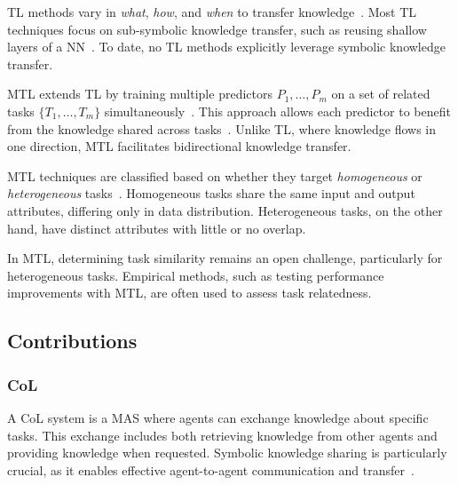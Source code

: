 \Gls{TL} methods vary in \emph{what}, \emph{how}, and \emph{when} to transfer knowledge~\cite{survey-transfer-learning-sinno-2010}.
%
Most \gls{TL} techniques focus on sub-symbolic knowledge transfer, such as reusing shallow layers of a \gls{NN}~\cite{cnn-tl-imagenet-shin-2016}.
%
To date, no \gls{TL} methods explicitly leverage symbolic knowledge transfer.

\gls{MTL} extends \gls{TL} by training multiple predictors \(P_1, \dots, P_m\) on a set of related tasks \(\{T_1, \dots, T_m\}\) simultaneously~\cite{multi-task-learning-caruana-1997}.
%
This approach allows each predictor to benefit from the knowledge shared across tasks~\cite{survey-multi-task-learning-zhang-2021}.
%
Unlike \gls{TL}, where knowledge flows in one direction, \gls{MTL} facilitates bidirectional knowledge transfer.

\gls{MTL} techniques are classified based on whether they target \emph{homogeneous} or \emph{heterogeneous} tasks~\cite{survey-heterogeneous-transfer-learning-day-2017}.
%
Homogeneous tasks share the same input and output attributes, differing only in data distribution.
%
Heterogeneous tasks, on the other hand, have distinct attributes with little or no overlap.

In \gls{MTL}, determining task similarity remains an open challenge, particularly for heterogeneous tasks.
%
Empirical methods, such as testing performance improvements with \gls{MTL}, are often used to assess task relatedness.


\subsection{Contributions}
\label{subsec:contributions}

\subsubsection{\gls{CoL}}
\label{subsubsec:col}
%

%
A \gls{CoL} system is a \gls{MAS} where agents can exchange knowledge about specific tasks.
%
This exchange includes both retrieving knowledge from other agents and providing knowledge when requested.
%
Symbolic knowledge sharing is particularly crucial, as it enables effective agent-to-agent communication and transfer~\cite{not-just-for-humans-omicini-2020}.
%

